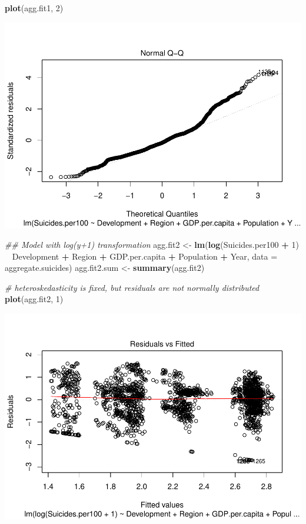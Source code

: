 \documentclass[11pt,]{article}
\newenvironment{Shaded}{\begin{snugshade}}{\end{snugshade}}
\newcommand{\CommentTok}[1]{\textcolor[rgb]{0.56,0.35,0.01}{\textit{#1}}}
\newcommand{\DataTypeTok}[1]{\textcolor[rgb]{0.13,0.29,0.53}{#1}}
\newcommand{\DecValTok}[1]{\textcolor[rgb]{0.00,0.00,0.81}{#1}}
\newcommand{\KeywordTok}[1]{\textcolor[rgb]{0.13,0.29,0.53}{\textbf{#1}}}
\newcommand{\NormalTok}[1]{#1}
\newcommand{\OperatorTok}[1]{\textcolor[rgb]{0.81,0.36,0.00}{\textbf{#1}}}
\newcommand{\StringTok}[1]{\textcolor[rgb]{0.31,0.60,0.02}{#1}}
\begin{document}
\begin{Shaded}
\begin{Highlighting}[]
\KeywordTok{plot}\NormalTok{(agg.fit1, }\DecValTok{2}\NormalTok{)}
\end{Highlighting}
\end{Shaded}

\includegraphics{An-Analysis-of-Suicide-Data_files/figure-latex/unnamed-chunk-5-2.pdf}

\begin{Shaded}
\begin{Highlighting}[]
\CommentTok{## Model with log(y+1) transformation}
\NormalTok{agg.fit2 <-}\StringTok{ }\KeywordTok{lm}\NormalTok{(}\KeywordTok{log}\NormalTok{(Suicides.per100 }\OperatorTok{+}\StringTok{ }\DecValTok{1}\NormalTok{) }\OperatorTok{~}\StringTok{ }\NormalTok{Development }\OperatorTok{+}\StringTok{ }\NormalTok{Region }\OperatorTok{+}\StringTok{ }\NormalTok{GDP.per.capita }\OperatorTok{+}\StringTok{ }\NormalTok{Population }\OperatorTok{+}\StringTok{ }\NormalTok{Year, }\DataTypeTok{data =}\NormalTok{ aggregate.suicides)}
\NormalTok{agg.fit2.sum <-}\StringTok{ }\KeywordTok{summary}\NormalTok{(agg.fit2)}

\CommentTok{# heteroskedasticity is fixed, but residuals are not normally distributed}
\KeywordTok{plot}\NormalTok{(agg.fit2, }\DecValTok{1}\NormalTok{)}
\end{Highlighting}
\end{Shaded}

\includegraphics{An-Analysis-of-Suicide-Data_files/figure-latex/unnamed-chunk-5-3.pdf}
\end{document}
